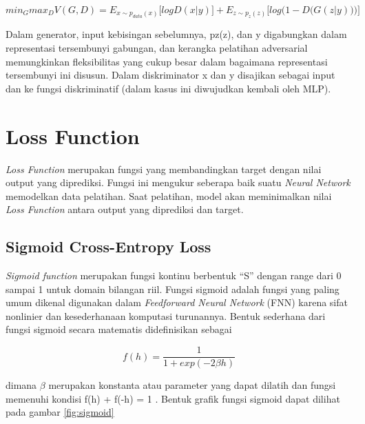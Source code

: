 \begin{equation}
  \label{eq:CGAN}
  min_{G} max_{D} V(G,D) =  E_{x \sim p_{data} (x)} \big[ log D(x|y) \big] + E_{z \sim p_{z} (z)} \big[ log  \big(1-D \big(G(z|y)\big) \big) \big]
\end{equation}

Dalam generator, input kebisingan sebelumnya, pz(z), dan y digabungkan dalam representasi tersembunyi gabungan, dan kerangka pelatihan adversarial memungkinkan fleksibilitas yang cukup besar dalam bagaimana representasi tersembunyi ini disusun. 
Dalam diskriminator x dan y disajikan sebagai input dan ke fungsi diskriminatif (dalam kasus ini diwujudkan kembali oleh MLP). \parencite{CGAN}

\section{Loss Function}
\label{sec:lossFunction}

\emph{Loss Function} merupakan fungsi yang membandingkan target dengan nilai output yang diprediksi. 
Fungsi ini mengukur seberapa baik suatu \emph{Neural Network} memodelkan data pelatihan. 
Saat pelatihan, model akan meminimalkan nilai \emph{Loss Function} antara output yang diprediksi dan target.

\subsection{Sigmoid Cross-Entropy Loss}
\label{sigmoidCrossEntropyLoss}

\emph{Sigmoid function} merupakan fungsi kontinu berbentuk “S” dengan range dari 0 sampai 1 untuk domain bilangan riil. 
Fungsi sigmoid adalah fungsi yang paling umum dikenal digunakan dalam \emph{Feedforward Neural Network} (FNN) karena sifat nonlinier dan kesederhanaan komputasi turunannya. 
Bentuk sederhana dari fungsi sigmoid secara matematis didefinisikan sebagai 

\begin{equation}
  \label{eq:sigmoid}
  f(h) =  \frac{1}{1+exp(-2 \beta h)} 
\end{equation}

dimana $\beta$ merupakan konstanta atau parameter yang dapat dilatih dan fungsi memenuhi kondisi f(h) + f(-h) = 1 \parencite{sigmoid}. Bentuk grafik fungsi sigmoid dapat dilihat pada gambar \ref{fig:sigmoid}

